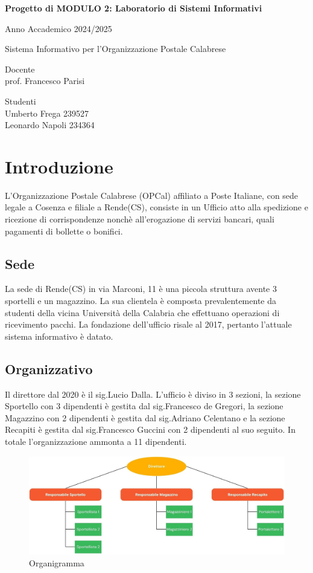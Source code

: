 \documentclass{article}
\author{Umberto Frega, Leonardo Napoli}
\begin{document}
\pagestyle{fancy}

\begin{titlepage}
	\centering
	{\Large \bfseries Progetto di MODULO 2: Laboratorio di Sistemi Informativi\par}
	{\Large Anno Accademico 2024/2025 \par}
	\vspace{1cm} %
	\vfill
	{\huge Sistema Informativo per l'Organizzazione Postale Calabrese\par}
	\vfill
	\noindent
	\begin{minipage}[t]{0.5\textwidth}
		\raggedright
		Docente \\  prof. Francesco Parisi
	\end{minipage}%
	\hfill
	\begin{minipage}[t]{0.4\textwidth}
		\raggedleft
		Studenti \\ Umberto Frega 239527 \\ Leonardo Napoli 234364
	\end{minipage}

\end{titlepage}

\section{Introduzione}
L'Organizzazione Postale Calabrese (OPCal) affiliato a Poste Italiane, con sede legale a Cosenza e filiale a Rende(CS), consiste in un Ufficio atto alla spedizione e ricezione di corrispondenze nonchè all'erogazione di servizi bancari, quali pagamenti di bollette o bonifici.
\subsection{Sede}
La sede di Rende(CS) in via Marconi, 11 è una piccola struttura avente 3 sportelli e un magazzino. La sua clientela è composta prevalentemente da studenti della vicina Università della Calabria che effettuano operazioni di ricevimento pacchi. La fondazione dell'ufficio risale al 2017, pertanto l'attuale sistema informativo è datato.
\subsection{Organizzativo}
Il direttore dal 2020 è il sig.Lucio Dalla. L'ufficio è diviso in 3 sezioni, la sezione Sportello con 3 dipendenti è gestita dal sig.Francesco de Gregori, la sezione Magazzino con 2 dipendenti è gestita dal sig.Adriano Celentano e la sezione Recapiti è gestita dal sig.Francesco Guccini con 2 dipendenti al suo seguito. In totale l'organizzazione ammonta a 11 dipendenti.
\begin{figure}[h]
	\centering
	\includegraphics[width=0.8\linewidth]{assets/organigramma.jpg}
	\caption{Organigramma}
\end{figure}
\end{document}
